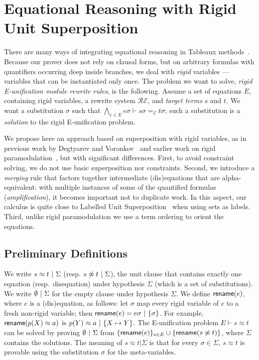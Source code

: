
\section{Equational Reasoning with Rigid Unit Superposition}
\label{sec:super}

There are many ways of integrating equational reasoning in Tableaux
methods~\cite{DB75,LS02,BR15,DV96}.
Because our prover does not rely on clausal forms, but on arbitrary formulas
with quantifiers occurring deep inside branches, we deal with {\em rigid}
variables --- variables that can be instantiated only once. The problem we want
to solve, {\em rigid E-unification module rewrite rules}, is the following.
Assume a set of equations $E$, containing rigid variables,
a rewrite system $\mathcal{RE}$, and {\em target terms} $s$ and $t$.
We want a substitution $\sigma$ such that $\bigwedge_{e \in E} e\sigma
\vdash s\sigma =_\mathcal{E} t\sigma$; such a substitution is a {\em solution}
to the rigid E-unification problem.

We propose here an approach based on superposition with rigid variables, as in
previous work by Degtyarev and Voronkov~\cite{DV96} and earlier work on rigid
paramodulation~\cite{DAP00}, but with significant differences. First, to avoid
constraint solving, we do not use basic superposition nor constraints. Second,
we introduce a {\em merging} rule that factors together intermediate
(dis)equations that are alpha-equivalent: with multiple instances of some of the
quantified formulas ({\em amplification}), it becomes important not to duplicate
work. In this aspect, our calculus is quite close to Labelled Unit
Superposition~\cite{KS10} when using sets as labels. Third, unlike rigid
paramodulation we use a term ordering to orient the equations.

\subsection{Preliminary Definitions}

We write $  s \approx t  ~|~  \Sigma$
(resp. $  s \not\approx t  ~|~  \Sigma$),
the unit clause that contains exactly one equation (resp.~disequation)
under hypothesis $\Sigma$ (which is a set of substitutions).
We write $\emptyset ~|~ \Sigma$ for the empty clause under hypothesis $\Sigma$.
We define $\textsf{rename}(e)$, where $e$ is a (dis)equation, as follows:
let $\sigma$ map every rigid variable of $e$ to a fresh non-rigid variable;
then $\textsf{rename}(e) =  e\sigma  ~|~  \{ \sigma \} $.
For example, $\textsf{rename}(p(X)\approx a)$
is $ p(Y)\approx a ~|~  \{ X\mapsto Y\} $.
The E-unification problem $E \vdash s\approx t$ can be solved by
proving $\emptyset  ~|~  \Sigma$
from $\{ \textsf{rename}(e) \}_{ e \in E }
\cup
\{ \textsf{rename}( s \not\approx t ) \}$,
where $\Sigma$ contains the solutions.
The meaning of $s \approx t | \Sigma$ is that for every $\sigma \in \Sigma$,
$s \approx t$ is provable using the substitution $\sigma$ for the meta-variables.

